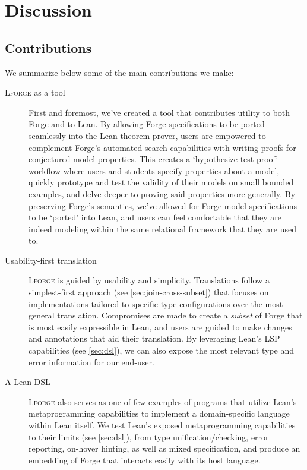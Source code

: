 \section{Discussion}
\subsection{Contributions}

We summarize below some of the main contributions we make:

\begin{description}
    \item[\textsc{Lforge} as a tool] First and foremost, we've created a tool that contributes utility to both Forge and to Lean. By allowing Forge specifications to be ported seamlessly into the Lean theorem prover, users are empowered to complement Forge's automated search capabilities with writing proofs for conjectured model properties. This creates a `hypothesize-test-proof' workflow where users and students specify properties about a model, quickly prototype and test the validity of their models on small bounded examples, and delve deeper to proving said properties more generally. By preserving Forge's semantics, we've allowed for Forge model specifications to be `ported' into Lean, and users can feel comfortable that they are indeed modeling within the same relational framework that they are used to. 
    \item[Usability-first translation] \textsc{Lforge} is guided by usability and simplicity. Translations follow a simplest-first approach (see \cref{sec:join-cross-subset}) that focuses on implementations tailored to specific type configurations over the most general translation. Compromises are made to create a \emph{subset} of Forge that is most easily expressible in Lean, and users are guided to make changes and annotations that aid their translation. By leveraging Lean's LSP capabilities (see \cref{sec:dsl}), we can also expose the most relevant type and error information for our end-user. 
    \item[A Lean DSL] \textsc{Lforge} also serves as one of few examples of programs that utilize Lean's metaprogramming capabilities to implement a domain-specific language within Lean itself. We test Lean's exposed metaprogramming capabilities to their limits (see \cref{sec:dsl}), from type unification/checking, error reporting, on-hover hinting, as well as mixed specification, and produce an embedding of Forge that interacts easily with its host language. 
\end{description}

